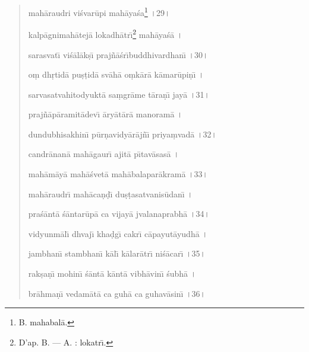\documentclass[a4paper, 11pt, oneside, french, landscape, twocolumn]{article}
\begin{document}
\begin{quotation}
mah\={a}raudri vi\'{s}var\={u}pi mah\={a}ya\'{s}a\footnote{B. mahabal\={a}.} \texthindi{।}29\texthindi{।}

\bigskip

kalp\={a}gnimah\={a}tej\={a} lokadh\={a}tr\={\i}\footnote{D'ap. B. --- A. : lokatr\={\i}.} mah\={a}ya\'{s}\={a} \texthindi{।}

sarasvat\={\i} vi\'{s}\={a}l\={a}k\d{s}\={\i} praj\~{n}\={a}\'{s}r\={\i}buddhivardhan\={\i} \texthindi{।}30\texthindi{।}

\bigskip

o\d{m} dh\d{r}tid\={a} pu\d{s}\d{t}id\={a} sv\={a}h\={a} o\d{m}k\={a}r\={a} k\={a}mar\={u}pi\d{n}\={\i} \texthindi{।}

sarvasatvahitodyukt\={a} sa\d{m}gr\={a}me t\={a}ra\d{n}\={\i} jay\={a} \texthindi{।}31\texthindi{।}

\bigskip

praj\~{n}\={a}p\={a}ramit\={a}dev\={\i} \={a}ry\={a}t\={a}r\={a} manoram\={a} \texthindi{।}

dundubhisakhin\={\i} p\={u}r\d{n}avidy\={a}r\={a}j\~{n}\={\i} priya\d{m}vad\={a} \texthindi{।}32\texthindi{।}

\bigskip

candr\={a}nan\={a} mah\={a}gaur\={\i} ajit\={a} p\={\i}tav\={a}sas\={a} \texthindi{।}

mah\={a}m\={a}y\={a} mah\={a}\'{s}vet\={a} mah\={a}balapar\={a}kram\={a} \texthindi{।}33\texthindi{।}

\bigskip

mah\={a}raudr\={\i} mah\={a}ca\d{n}\d{d}\={\i} du\d{s}\d{t}asatvanis\={u}dan\={\i} \texthindi{।}

pra\'{s}\={a}nt\={a} \'{s}\={a}ntar\={u}p\={a} ca vijay\={a} jvalanaprabh\={a} \texthindi{।}34\texthindi{।}

\bigskip

vidyunm\={a}l\={\i} dhvaj\={\i} kha\d{d}g\={\i} cakr\={\i} c\={a}payut\={a}yudh\={a} \texthindi{।}

jambhan\={\i} stambhan\={\i} k\={a}l\={\i} k\={a}lar\={a}tr\={\i} ni\'{s}\={a}car\={\i} \texthindi{।}35\texthindi{।}

\bigskip

rak\d{s}a\d{n}\={\i} mohin\={\i} \'{s}\={a}nt\={a} k\={a}nt\={a} vibh\={a}vin\={\i} \'{s}ubh\={a} \texthindi{।}

br\={a}hma\d{n}\={\i} vedam\={a}t\={a} ca guh\={a} ca guhav\={a}sin\={\i} \texthindi{।}36\texthindi{।}

\bigskip


\end{quotation}
\end{document}
